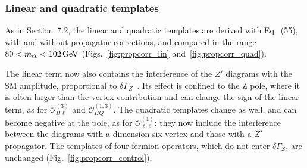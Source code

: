 \subsubsection{Linear and quadratic templates}

As in Section~7.2,
the linear and quadratic templates are derived with
Eq.~(55),
with and without propagator corrections, and compared in the range
$80 < m_{\ell\ell} < 102\,\text{Ge\hspace{-.08em}V}$
(Figs.~\ref{fig:propcorr_lin} and~\ref{fig:propcorr_quad}).

The linear term now also contains the interference of the $Z'$ diagrams with
the SM amplitude, proportional to $\delta\Gamma_Z$~\cite{Brivio:2020onw}. Its
effect is confined to the Z pole, where it is often larger than the vertex
contribution and can change the sign of the linear term, as for
$\mathcal{O}_{H\ell}^{(3)}$ and $\mathcal{O}_{HQ}^{(1,3)}$.
The quadratic templates change as well, and can become negative at the pole, as
for $\mathcal{O}_{\ell\ell}^{(1)}$: they now include the interference between
the diagrams with a dimension-six vertex and those with a $Z'$ propagator.
The templates of four-fermion operators, which do not enter $\delta\Gamma_Z$,
are unchanged (Fig.~\ref{fig:propcorr_control}).

